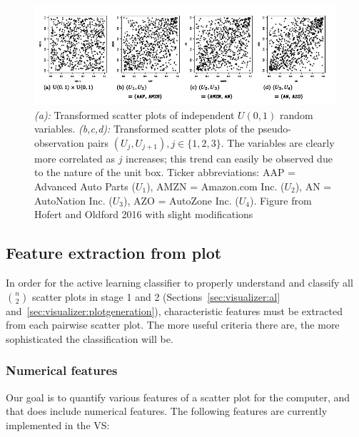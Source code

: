 \begin{figure}[htb]
	\begin{center}
		\includegraphics[width=1\linewidth]{ch-visualizer/figures/hofertoldford}
		\caption[Transformed scatter plots of independent $U(0,1)$ random 
		variables and pseudo-observation pairs $(U_{j},U_{j+1}),j\in 
		\{1,2,3\}$ which are more correlated the larger $j$ is.]{\textit{(a):} 
		Transformed scatter plots of independent $U(0,1)$ random variables. 
		\textit{(b,c,d):} Transformed scatter plots of the pseudo-observation 
		pairs $(U_{j},U_{j+1}),j\in \{1,2,3\}$. The variables are clearly more 
		correlated as $j$ increases; this trend can easily be observed due to 
		the nature of the unit box. Ticker abbreviations: 
		AAP = Advanced Auto Parts ($U_1$), AMZN = Amazon.com Inc. ($U_2$), 
		AN = AutoNation Inc. ($U_3$), AZO = AutoZone Inc. ($U_4$).
		Figure from Hofert and Oldford 2016 with slight 
		modifications~\cite{hofert2016}}
		\label{fig:visualizer:hofertoldford}
	\end{center}
\end{figure}

\subsection{Feature extraction from plot}
\label{sec:visualizer:scatterplot:features}

In order for the active learning classifier to properly understand and classify 
all $n \choose 2$ scatter plots in stage 1 and 2
(Sections~\ref{sec:visualizer:al} and~\ref{sec:visualizer:plotgeneration}), 
characteristic features must be extracted from each pairwise scatter plot. The 
more useful criteria there are, the more sophisticated the classification will 
be.

\subsubsection{Numerical features}

Our goal is to quantify various features of a scatter plot for the computer, 
and that does include numerical features. The following features are currently 
implemented in the VS: 


